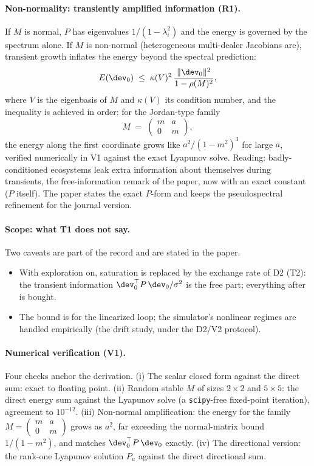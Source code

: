\paragraph{Non-normality: transiently amplified information (R1).}
If $M$ is normal, $P$ has eigenvalues $1/(1 - \lambda_i^2)$ and the energy
is governed by the spectrum alone. If $M$ is non-normal (heterogeneous
multi-dealer Jacobians are), transient growth inflates the energy beyond the
spectral prediction:
\begin{equation*}
E(\dev_0) \;\le\; \kappa(V)^2\,\frac{\|\dev_0\|^2}{1 - \rho(M)^2},
\end{equation*}
where $V$ is the eigenbasis of $M$ and $\kappa(V)$ its condition number, and
the inequality is achieved in order: for the Jordan-type family
\begin{equation*}
M \;=\; \begin{pmatrix} m & a \\ 0 & m \end{pmatrix},
\end{equation*}
the energy along the first coordinate grows like $a^2/(1 - m^2)^3$ for
large $a$, verified numerically in V1 against the exact Lyapunov solve.
Reading: badly-conditioned ecosystems leak extra information about
themselves during transients, the free-information remark of the paper, now
with an exact constant ($P$ itself). The paper states the exact $P$-form and
keeps the pseudospectral refinement for the journal version.

\paragraph{Scope: what T1 does not say.}
Two caveats are part of the record and are stated in the paper.
\begin{itemize}
\item With exploration on, saturation is replaced by the exchange rate of
D2 (T2): the transient information $\dev_0^\top P\,\dev_0 / \sigma^2$ is
the free part; everything after is bought.
\item The bound is for the linearized loop; the simulator's nonlinear
regimes are handled empirically (the drift study, under the D2/V2
protocol).
\end{itemize}

\paragraph{Numerical verification (V1).}
Four checks anchor the derivation. (i) The scalar closed form against the
direct sum: exact to floating point. (ii) Random stable $M$ of sizes
$2 \times 2$ and $5 \times 5$: the direct energy sum against the Lyapunov
solve (a \texttt{scipy}-free fixed-point iteration), agreement to
$10^{-12}$. (iii) Non-normal amplification: the energy for the family
$M = \left(\begin{smallmatrix} m & a \\ 0 & m \end{smallmatrix}\right)$
grows as $a^2$, far exceeding the normal-matrix bound $1/(1 - m^2)$, and
matches $\dev_0^\top P\,\dev_0$ exactly. (iv) The directional version: the
rank-one Lyapunov solution $P_u$ against the direct directional sum.


